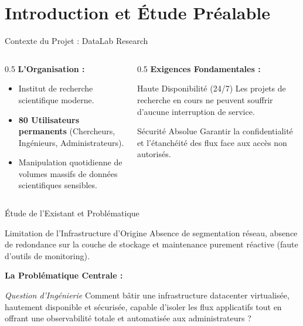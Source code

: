 \section{Introduction et Étude Préalable}

\begin{frame}{Contexte du Projet : DataLab Research}
    \begin{columns}[T]
        \begin{column}{0.5\textwidth}
            \textbf{L'Organisation :}
            \begin{itemize}
                \item Institut de recherche scientifique moderne.
                \item \textbf{80 Utilisateurs permanents} (Chercheurs, Ingénieurs, Administrateurs).
                \item Manipulation quotidienne de volumes massifs de données scientifiques sensibles.
            \end{itemize}
        \end{column}
        
        \begin{column}{0.5\textwidth}
            \textbf{Exigences Fondamentales :}
            \begin{block}{Haute Disponibilité (24/7)}
                Les projets de recherche en cours ne peuvent souffrir d'aucune interruption de service.
            \end{block}
            \begin{block}{Sécurité Absolue}
                Garantir la confidentialité et l'étanchéité des flux face aux accès non autorisés.
            \end{block}
        \end{column}
    \end{columns}
\end{frame}

\begin{frame}{Étude de l'Existant et Problématique}
    \begin{alertblock}{Limitation de l'Infrastructure d'Origine}
        Absence de segmentation réseau, absence de redondance sur la couche de stockage et maintenance purement réactive (faute d'outils de monitoring).
    \end{alertblock}

    \vspace{0.3cm}
    \textbf{La Problématique Centrale :}
    \begin{exampleblock}{\textit{Question d'Ingénierie}}
        Comment bâtir une infrastructure datacenter virtualisée, hautement disponible et sécurisée, capable d'isoler les flux applicatifs tout en offrant une observabilité totale et automatisée aux administrateurs ?
    \end{exampleblock}
\end{frame}

